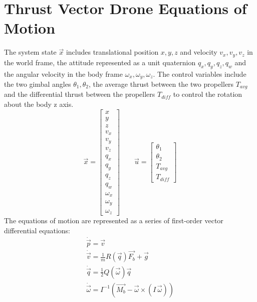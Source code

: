 \documentclass[]{article}
\begin{document}
	
	\section*{Thrust Vector Drone Equations of Motion}
	
The system state $\vec{x}$ includes translational position $x, y,  z $ and velocity $v_x, v_y, v_z $  in the world frame, the attitude represented as a unit quaternion $q_x, q_y,  q_z, q_w$ and the angular velocity in the body frame $ \omega_x, \omega_y, \omega_z$. The control variables include the two gimbal angles $\theta_1, \theta_2 $, the average thrust between the two propellers $T_{avg}$ and the differential thrust between the propellers $T_{diff}$ to control the rotation about the body z axis.
        \[
        \vec{x} =
        \begin{bmatrix}
        x \\ y \\ z \\ v_x \\ v_y \\ v_z \\ q_x \\ q_y \\ q_z \\ q_w \\ \omega_x \\ \omega_y \\ \omega_z
        \end{bmatrix}
        \qquad
        \vec{u} =
        \begin{bmatrix}
        \theta_1 \\ \theta_2 \\ T_{avg} \\ T_{diff}
        \end{bmatrix}
        \]
        The equations of motion are represented as a series of first-order vector differential equations:
        \begin{gather}
        	\dot{\vec{p}}  = \vec{v}         \label{eqMotion1}	\\
        	\dot{\vec{v}}  = \frac{1}{m}R(\vec{q})\vec{F_b}+\vec{g}  \label{eqMotion2} \\
        	\dot{\vec{q}} = \frac{1}{2}Q(\vec{\omega})\vec{q}  \label{eqMotion3} \\
        	\dot{\vec{\omega}} = I^{-1}\!\left(\vec{M_b} - \vec{\omega} \times (I\,\vec{\omega})\right) \label{eqMotion4}
        \end{gather}
\end{document}
